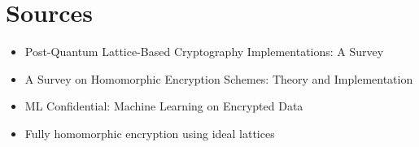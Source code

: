 \documentclass{article}
\begin{document}
\section{Sources}

\begin{itemize}
    \item Post-Quantum Lattice-Based Cryptography Implementations: A Survey \cite{10.1145/3292548}
    \item A Survey on Homomorphic Encryption Schemes: Theory and Implementation \cite{10.1145/3214303}
    \item ML Confidential: Machine Learning on Encrypted Data \cite{10.1007/978-3-642-37682-5_1}
    \item Fully homomorphic encryption using ideal lattices \cite{10.1145/1536414.1536440}
\end{itemize}



\end{document}
